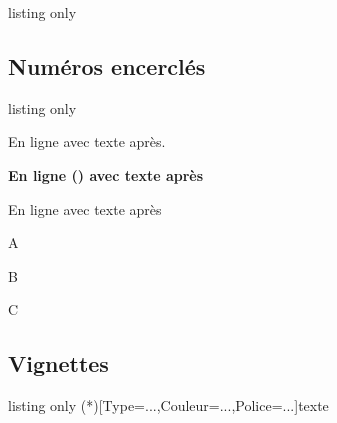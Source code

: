 \documentclass[french,11pt,a4paper]{article}
\begin{document}
\begin{DemoCode}{listing only}
\end{DemoCode}

\begin{DemoCode}{}

\end{DemoCode}

\subsection{Numéros encerclés}

\begin{DemoCode}{listing only}
\end{DemoCode}

\begin{DemoCode}{}
En ligne  avec texte après.
\end{DemoCode}

\begin{DemoCode}{}
{\bfseries\sffamily\Huge En ligne () avec texte après}
\end{DemoCode}

\begin{DemoCode}{}
{\Large En ligne  avec texte après}
\end{DemoCode}

\begin{DemoCode}{}
\begin{enumerate}[label={\CircledNumber[raise=false]{\arabic*}}]
	\item A
	\item B
	\item C
\end{enumerate}
\end{DemoCode}

\subsection{Vignettes}

\begin{DemoCode}{listing only}
\AffVignette(*)[Type=...,Couleur=...,Police=...]{texte}
\end{DemoCode}
\end{document}
